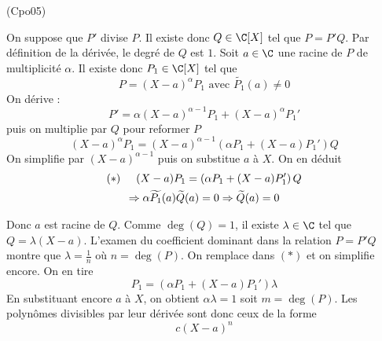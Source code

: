 \begin{tiny}(Cpo05)\end{tiny} On suppose que $P'$ divise $P$. Il existe donc $Q\in \C[X]$ tel que $P=P'Q$. Par définition de la dérivée, le degré de $Q$ est $1$.\newline
Soit $a\in \C$ une racine de $P$ de multiplicité $\alpha$. Il existe donc $P_1\in \C[X]$ tel que 
\begin{displaymath}
 P=(X-a)^\alpha P_1\text{ avec }\widetilde{P_1}(a)\neq 0
\end{displaymath}
On dérive :
\begin{displaymath}
 P' = \alpha(X-a)^{\alpha -1}P_1 +(X-a)^\alpha P_1'
\end{displaymath}
puis on multiplie par $Q$ pour reformer $P$
\begin{displaymath}
 (X-a)^\alpha P_1= (X-a)^{\alpha -1}\left(\alpha P_1 +(X-a)P_1'\right) Q 
\end{displaymath}
On simplifie par $(X-a)^{\alpha-1}$ puis on substitue $a$ à $X$. On en déduit
\begin{multline*}
 (*)\hspace{0.5cm} (X-a) P_1=\left(\alpha P_1 +(X-a)P_1'\right) Q \\
\Rightarrow \alpha \widetilde{P_1}(a)\widetilde{Q}(a)=0 \Rightarrow \widetilde{Q}(a)=0
\end{multline*}

Donc $a$ est racine de $Q$. Comme $\deg(Q)=1$, il existe $\lambda\in \C$ tel que $Q=\lambda(X-a)$. L'examen du coefficient dominant dans la relation $P=P'Q$ montre que $\lambda = \frac{1}{n}$ où $n=\deg(P)$. On remplace dans $(*)$ et on simplifie encore. On en tire
\begin{displaymath}
 P_1 = \left( \alpha P_1 +(X-a)P_1'\right)\lambda
\end{displaymath}
En substituant encore $a$ à $X$, on obtient $\alpha \lambda=1$ soit $m=\deg(P)$. Les polynômes divisibles par leur dérivée sont donc ceux de la forme
\begin{displaymath}
 c(X-a)^n
\end{displaymath}
